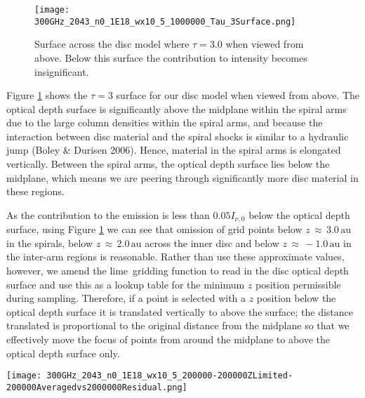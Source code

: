 \documentclass[fleqn,usenatbib]{mnras}
\newcommand{\lime}{{\sc lime}}
\begin{document}
\begin{figure}
    \centering
    \texttt{[image: 300GHz\_2043\_n0\_1E18\_wx10\_5\_1000000\_Tau\_3Surface.png]}
    \caption{Surface across the disc model where $\tau = 3.0$ when viewed from above. Below this surface the contribution to intensity becomes insignificant.}
    \label{fig:tausurface}
\end{figure}

Figure \ref{fig:tausurface} shows the $\tau = 3$ surface for our disc model when viewed from above. The optical depth surface is significantly above the midplane within the spiral arms due to the large column densities within the spiral arms, and because the interaction between disc material and the spiral shocks is similar to a hydraulic jump (Boley \& Durisen 2006). Hence, material in the spiral arms is elongated vertically. Between the spiral arms, the optical depth surface lies below the midplane, which means we are peering through significantly more disc material in these regions.

\smallskip

As the contribution to the emission is less than $0.05I_{\nu,0}$ below the optical depth surface, using Figure \ref{fig:tausurface} we can see that omission of grid points below $z\,\approx\,3.0\,\mathrm{au}$ in the spirals, below $z\,\approx\,2.0\,\mathrm{au}$ across the inner disc and below $z\,\approx\,-1.0\,\mathrm{au}$ in the inter-arm regions is reasonable. Rather than use these approximate values, however, we amend the \lime\ gridding function to read in the disc optical depth surface and use this as a lookup table for the minimum $z$ position permissible during sampling. Therefore, if a point is selected with a $z$ position below the optical depth surface it is translated vertically to above the surface; the distance translated is proportional to the original distance from the midplane so that we effectively move the focus of points from around the midplane to above the optical depth surface only.

\begin{figure*}
    \texttt{[image: 300GHz\_2043\_n0\_1E18\_wx10\_5\_200000-200000ZLimited-200000Averagedvs2000000Residual.png]}
    \caption{Residual flux between \lime\ runs using $2 \times 10^5$ grid points and different sampling methods, f$_1$, and $2 \times 10^6$ grid points with standard sampling, f$_2$. We define this residual as $|$(f$_1$-f$_2$)$|$/(f$_1$+f$_2$), where $f$ denotes flux per pixel. The panel on the left is the residual result for our standard sampling seen in Figure \ref {fig:pointsresidualcompare}. The middle panel shows the residual result when using an optical depth surface to constrain the positioning of grid points, which we refer to as our optimal sampling. The right panel shows the residual result for an average of eight optimally sampled \lime\ runs using identical input parameters.}
    \label{fig:zlimitedaverageresidualcompare}
\end{figure*}
\end{document}
